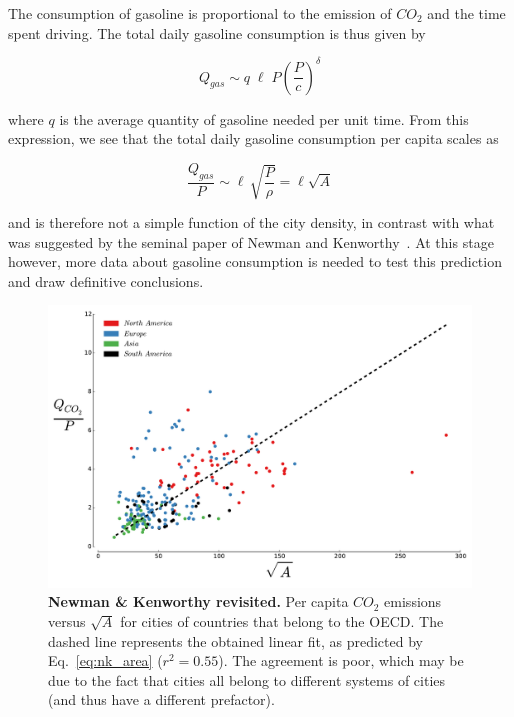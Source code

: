 The consumption of gasoline is proportional to the emission of $CO_2$ and the time spent driving.
The total daily gasoline consumption is thus given by

\begin{equation} 
    Q_{gas} \sim q\; \ell\; P \left(\frac{P}{c}\right)^{\delta}
\end{equation}

where $q$ is the average quantity of gasoline needed per unit time. From this
expression, we see that the total daily gasoline consumption per capita scales
as

\begin{equation} 
    \frac{Q_{gas}}{P}\sim \ell\, \sqrt{\frac{P}{\rho}} = \ell
\sqrt{A} 
    \label{eq:nk_area}
\end{equation}

and is therefore not a simple function of the city density, in contrast with
what was suggested by the seminal paper of Newman and
Kenworthy~\cite{Newman:1989}. At this stage however, more data about gasoline
consumption is needed to test this prediction and draw definitive conclusions.

\begin{figure}
    \centering
    \includegraphics[width=\textwidth]{gfx/chapter-scaling/nk_model.pdf}
    \caption{{\bf Newman \& Kenworthy revisited.} Per capita $CO_2$ emissions versus $\sqrt{A}$ for cities of
    countries that belong to the OECD. The dashed line represents the obtained
linear fit, as predicted by Eq.~\ref{eq:nk_area} ($r^2=0.55$). The agreement is
poor, which may be due to the fact that cities all belong to different systems
of cities (and thus have a different prefactor).\label{fig:nk_model}}
\end{figure}

